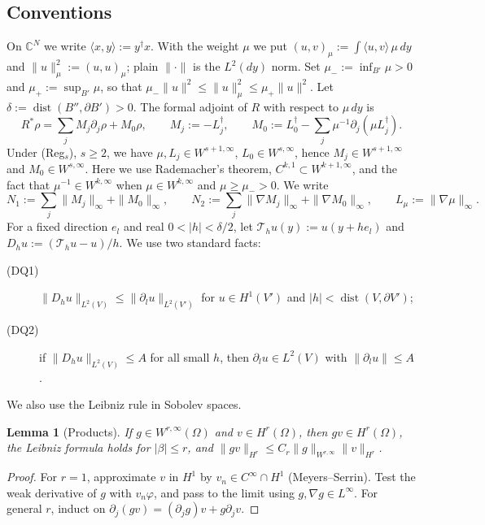 \documentclass[11pt]{article}
\theoremstyle{plain}
\newtheorem{lemma}[theorem]{Lemma}
\theoremstyle{definition}
\theoremstyle{remark}
\newcommand{\C}{\mathbb{C}}
\begin{document}
\subsection{Conventions}\label{app:r1-conventions}

On $\C^N$ we write $\langle x,y\rangle := y^\dagger x$. With the weight $\mu$ we put $(u,v)_\mu := \int\langle u,v\rangle\,\mu\,dy$ and $\|u\|_\mu^2 := (u,u)_\mu$; plain $\|\cdot\|$ is the $L^2(dy)$ norm. Set $\mu_- := \inf_{B'} \mu > 0$ and $\mu_+ := \sup_{B'} \mu$, so that $\mu_-\|u\|^2 \le \|u\|_\mu^2 \le \mu_+\|u\|^2$. Let $\delta := \operatorname{dist}(B'',\partial B') > 0$. The formal adjoint of $R$ with respect to $\mu\,dy$ is
\[
  R^*\rho = \sum_j M_j\partial_j\rho + M_0\rho,\qquad M_j := -L_j^\dagger,\qquad M_0 := L_0^\dagger - \sum_j \mu^{-1}\partial_j(\mu L_j^\dagger).
\]
Under (Reg$_s$), $s \ge 2$, we have $\mu, L_j \in W^{s+1,\infty}$, $L_0 \in W^{s,\infty}$, hence $M_j \in W^{s+1,\infty}$ and $M_0 \in W^{s,\infty}$. Here we use Rademacher's theorem, $C^{k,1} \subset W^{k+1,\infty}$, and the fact that $\mu^{-1} \in W^{k,\infty}$ when $\mu \in W^{k,\infty}$ and $\mu \ge \mu_- > 0$. We write
\[
  N_1 := \sum_j\|M_j\|_\infty + \|M_0\|_\infty,\qquad N_2 := \sum_j\|\nabla M_j\|_\infty + \|\nabla M_0\|_\infty,\qquad L_\mu := \|\nabla \mu\|_\infty .
\]
For a fixed direction $e_l$ and real $0 < |h| < \delta/2$, let $\mathcal T_hu(y) := u(y + he_l)$ and $D_hu := (\mathcal T_hu - u)/h$. We use two standard facts:
\begin{description}
  \item[(DQ1)] $\|D_hu\|_{L^2(V)} \le \|\partial_lu\|_{L^2(V')}$ for $u \in H^1(V')$ and $|h| < \operatorname{dist}(V,\partial V')$;
  \item[(DQ2)] if $\|D_hu\|_{L^2(V)} \le A$ for all small $h$, then $\partial_lu \in L^2(V)$ with $\|\partial_lu\| \le A$.
\end{description}
We also use the Leibniz rule in Sobolev spaces.

\begin{lemma}[Products]\label{lem:leibniz}
If $g \in W^{r,\infty}(\Omega)$ and $v \in H^r(\Omega)$, then $gv \in H^r(\Omega)$, the Leibniz formula holds for $|\beta| \le r$, and $\|gv\|_{H^r} \le C_r\|g\|_{W^{r,\infty}}\|v\|_{H^r}$.
\end{lemma}

\begin{proof}
For $r = 1$, approximate $v$ in $H^1$ by $v_n \in C^\infty\cap H^1$ (Meyers--Serrin). Test the weak derivative of $g$ with $v_n\varphi$, and pass to the limit using $g,\nabla g \in L^\infty$. For general $r$, induct on $\partial_j(gv) = (\partial_jg)v + g\partial_jv$.
\end{proof}
\end{document}
